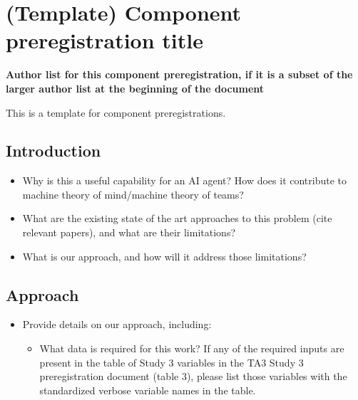 \chapter{(Template) Component preregistration title}
\label{ch:template}
\textbf{Author list for this component preregistration, if it is a subset of
the larger author list at the beginning of the document}

This is a template for component preregistrations.

\section{Introduction}

\begin{itemize}

    \item Why is this a useful capability for an AI agent? How does it
        contribute to machine theory of mind/machine theory of teams?

    \item What are the existing state of the art approaches to this problem
        (cite relevant papers), and what are their limitations?

    \item  What is our approach, and how will it address those limitations?

\end{itemize}

\section{Approach}

\begin{itemize}

\item Provide details on our approach, including:

    \begin{itemize}

        \item What data is required for this work? If any of the required inputs
            are present in the table of Study 3 variables in the TA3 Study 3
            preregistration document (table 3), please list those variables with
            the standardized verbose variable names in the table.

    \end{itemize}

\end{itemize}

